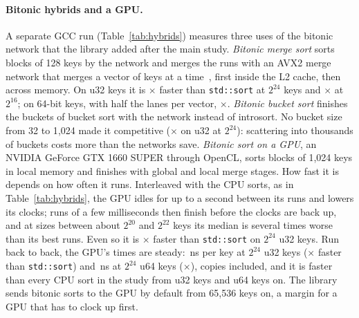 \documentclass[11pt]{article}
\theoremstyle{definition}
\begin{document}
\paragraph{Bitonic hybrids and a GPU.} A separate GCC run
(Table~\ref{tab:hybrids}) measures three uses of the bitonic network that the
library added after the main study. \emph{Bitonic merge sort} sorts blocks of
128 keys by the network and merges the runs with an AVX2 merge network that
merges a vector of keys at a time~\cite{chhugani2008simd}, first inside the
L2 cache, then across memory. On u32 keys it is
$\times$ faster than
\texttt{std::sort} at $2^{24}$ keys and $\times$
at $2^{16}$; on 64-bit keys, with half the lanes per vector,
$\times$. \emph{Bitonic bucket
sort} finishes the buckets of bucket sort with the network instead of
introsort. No bucket size from 32 to 1{,}024 made it competitive
($\times$ on u32 at $2^{24}$):
scattering into thousands of buckets costs more than the networks save.
\emph{Bitonic sort on a GPU}, an NVIDIA GeForce GTX 1660 SUPER through
OpenCL, sorts blocks of 1{,}024 keys in local memory and finishes with global
and local merge stages. How fast it is depends on how often it runs.
Interleaved with the CPU sorts, as in Table~\ref{tab:hybrids}, the GPU idles
for up to a second between its runs and lowers its clocks; runs of a few
milliseconds then finish before the clocks are back up, and at sizes between
about $2^{20}$ and $2^{22}$ keys its median is several times worse than its
best runs. Even so it is $\times$
faster than \texttt{std::sort} on $2^{24}$ u32 keys. Run back to back, the
GPU's times are steady: \,ns per key at $2^{24}$ u32 keys
($\times$ faster than \texttt{std::sort}) and
\,ns at $2^{24}$ u64 keys
($\times$), copies included, and it is faster than
every CPU sort in the study from  u32 keys and
 u64 keys on. The library sends bitonic sorts to the GPU by
default from 65{,}536 keys on, a margin for a GPU that has to clock up first.

\begin{table}[t]
\centering
\small
\resizebox{\linewidth}{!}{}
\caption{Bitonic hybrids and the GPU (one GCC run; all results
 correct): speed-up over \texttt{std::sort} in the same run.
The GPU times include the copies to and from the device.}
\label{tab:hybrids}
\end{table}
\end{document}
